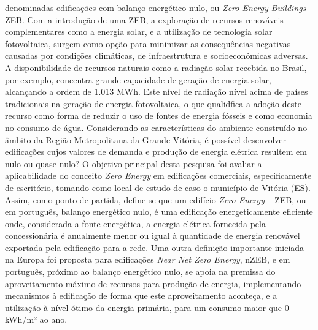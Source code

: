 \begin{onehalfspace}
    denominadas edificações com balanço energético nulo, 
    ou \textit{Zero Energy Buildings} – ZEB.
    Com a introdução de uma ZEB, a exploração de recursos renováveis complementares 
    como a energia solar, e a utilização de tecnologia solar fotovoltaica, surgem como 
    opção para minimizar as consequências negativas causadas por condições climáticas, 
    de infraestrutura e socioeconômicas adversas.\vspace*{0.3cm} \newline
    \noindent A disponibilidade de recursos naturais como a radiação solar recebida 
    no Brasil, por exemplo, concentra grande capacidade de geração de energia solar,
    alcançando a ordem de 1.013 MWh. Este nível de radiação nível acima de países 
    tradicionais na geração de energia fotovoltaica, o que qualidfica a adoção deste 
    recurso como forma de reduzir o uso de fontes de energia fósseis e como economia 
    no consumo de água.\vspace*{0.3cm} \newline
    \noindent Considerando as características do ambiente construído no âmbito da 
    Região Metropolitana da Grande Vitória, é possível desenvolver edificações cujos 
    valores de demanda e produção de energia elétrica resultem em nulo ou quase nulo? 
    O objetivo principal desta pesquisa foi avaliar a aplicabilidade do conceito 
    \textit{Zero Energy} em edificações comerciais, especificamente de escritório, 
    tomando como local de estudo de caso o município de Vitória (ES).\vspace*{0.3cm} \newline
    \noindent Assim, como ponto de partida, define-se que um edifício 
    \textit{Zero Energy} – ZEB, ou em português, balanço energético nulo, é uma 
    edificação energeticamente eficiente onde, considerada a fonte energética, a 
    energia elétrica fornecida pela concessionária é anualmente menor ou igual à 
    quantidade de energia renovável exportada pela edificação para a rede.\vspace*{0.3cm} \newline
    \noindent Uma outra definição importante iniciada na Europa foi proposta para 
    edificações \textit{Near Net Zero Energy}, nZEB, e em português, próximo ao 
    balanço energético nulo, se apoia na premissa do aproveitamento máximo 
    de recursos para produção de energia, implementando mecanismos à edificação de 
    forma que este aproveitamento aconteça, e a utilização à nível ótimo da energia 
    primária, para um consumo maior que 0 kWh/m² ao ano.\vspace*{0.3cm} \newline

\end{onehalfspace}
